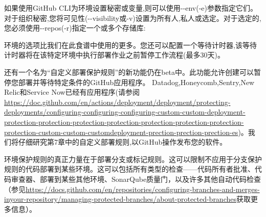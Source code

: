 
如果使用GitHub CLI为环境设置秘密或变量,则可以使用-{}-env(-e)参数指定它们。对于组织秘密,您将可见性(-{}-visibility或-v)设置为所有人,私人或选定。对于选定的,您必须使用-{}-repos(-r)指定一个或多个存储库:


环境的选项比我们在此食谱中使用的更多。您还可以配置一个等待计时器,该等待计时器将在该特定环境中执行部署作业之前暂停工作流程(最多30天)。

还有一个名为“自定义部署保护规则”的新功能仍在beta中。此功能允许创建可以暂停您部署并等待特定条件的GitHub应用程序。 Datadog,Honeycomb,Sentry,New Relic和Service Now已经有应用程序(请参阅\url{https://doc.github.com/en/actions/deployment/deployment/protecting-deployments/configuring-configuring-configuring-custom-custom-deployment-protection-protection-protection-protection-protection-protection-protection-protection-custom-custom-customdeployment-prection-prection-prection-es})。我们将仔细研究第7章中的自定义部署规则,以GitHub操作发布您的软件。

环境保护规则的真正力量在于部署分支或标记规则。这可以限制不应用于分支保护规则的代码部署到某些环境。这可以包括所有类型的检查——代码所有者批准、代码审查器、部署到某些其他环境、SonarQube质量门，以及许多其他自动代码检查（参见\url{https://docs.github.com/en/repositories/configuring-branches-and-merges-inyour-repository/managing-protected-branches/about-protected-branches}获取更多信息）。

























